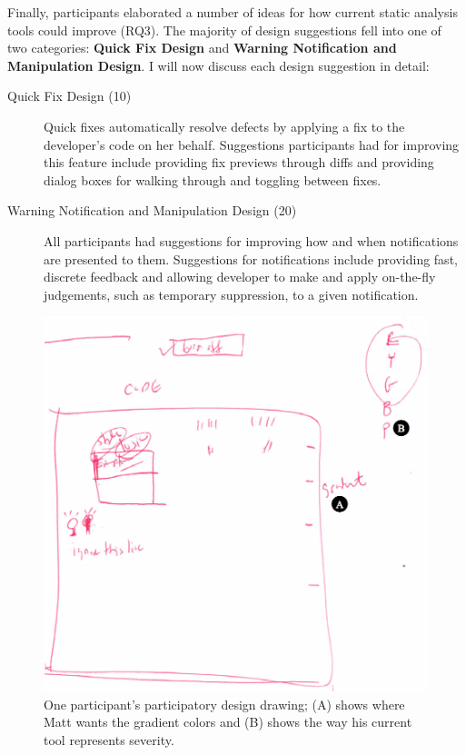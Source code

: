 \documentclass{llncs}
\begin{document}
Finally, participants elaborated a number of ideas for how current static analysis tools could improve (RQ3). 
The majority of design suggestions fell into one of two categories: \textbf{Quick Fix Design} and \textbf{Warning Notification and Manipulation Design}. I will now discuss each design suggestion in detail:
\begin{description}
	\item[Quick Fix Design (10)] Quick fixes automatically resolve defects by applying a fix to the developer's code on her behalf. Suggestions participants had for improving this feature include providing fix previews through diffs and providing dialog boxes for walking through and toggling between fixes. 
	\item [Warning Notification and Manipulation Design (20)] All participants had suggestions for improving how and when notifications are presented to them. Suggestions for notifications include providing fast, discrete feedback and allowing developer to make and apply on-the-fly judgements, such as temporary suppression, to a given notification. 
\end{description}

\begin{figure} [h]
	\centering
	\includegraphics[width=\textwidth]{figs/participatory.pdf}
	\caption{One participant's participatory design drawing; (A) shows where Matt wants the gradient colors and (B) shows the way his current tool represents severity.}
	\label{fig:drawing}
\end{figure}
\end{document}
